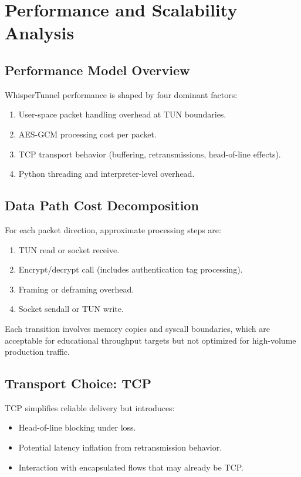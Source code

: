 \chapter{Performance and Scalability Analysis}

\section{Performance Model Overview}
WhisperTunnel performance is shaped by four dominant factors:
\begin{enumerate}[leftmargin=2em]
\item User-space packet handling overhead at TUN boundaries.
\item AES-GCM processing cost per packet.
\item TCP transport behavior (buffering, retransmissions, head-of-line effects).
\item Python threading and interpreter-level overhead.
\end{enumerate}

\section{Data Path Cost Decomposition}
For each packet direction, approximate processing steps are:
\begin{enumerate}[leftmargin=2em]
\item TUN read or socket receive.
\item Encrypt/decrypt call (includes authentication tag processing).
\item Framing or deframing overhead.
\item Socket sendall or TUN write.
\end{enumerate}

Each transition involves memory copies and syscall boundaries, which are acceptable for educational throughput targets but not optimized for high-volume production traffic.

\section{Transport Choice: TCP}
TCP simplifies reliable delivery but introduces:
\begin{itemize}[leftmargin=2em]
\item Head-of-line blocking under loss.
\item Potential latency inflation from retransmission behavior.
\item Interaction with encapsulated flows that may already be TCP.
\end{itemize}

